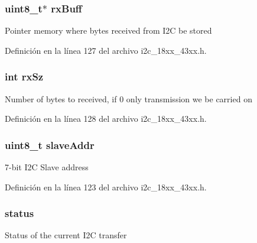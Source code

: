 \subsubsection[{\texorpdfstring{rx\+Buff}{rxBuff}}]{\setlength{\rightskip}{0pt plus 5cm}uint8\+\_\+t$\ast$ rx\+Buff}\hypertarget{struct_i2_c___x_f_e_r___t_a0aa410ff8cbc01a00b2fa2189e1c2938}{}\label{struct_i2_c___x_f_e_r___t_a0aa410ff8cbc01a00b2fa2189e1c2938}
Pointer memory where bytes received from I2C be stored 

Definición en la línea 127 del archivo i2c\+\_\+18xx\+\_\+43xx.\+h.

\subsubsection[{\texorpdfstring{rx\+Sz}{rxSz}}]{\setlength{\rightskip}{0pt plus 5cm}int rx\+Sz}\hypertarget{struct_i2_c___x_f_e_r___t_a745e2b08d1a5413929a13d9aa30137c5}{}\label{struct_i2_c___x_f_e_r___t_a745e2b08d1a5413929a13d9aa30137c5}
Number of bytes to received, if 0 only transmission we be carried on 

Definición en la línea 128 del archivo i2c\+\_\+18xx\+\_\+43xx.\+h.

\subsubsection[{\texorpdfstring{slave\+Addr}{slaveAddr}}]{\setlength{\rightskip}{0pt plus 5cm}uint8\+\_\+t slave\+Addr}\hypertarget{struct_i2_c___x_f_e_r___t_a771bfcb0b066269afae6905ce5804c89}{}\label{struct_i2_c___x_f_e_r___t_a771bfcb0b066269afae6905ce5804c89}
7-\/bit I2C Slave address 

Definición en la línea 123 del archivo i2c\+\_\+18xx\+\_\+43xx.\+h.

\subsubsection[{\texorpdfstring{status}{status}}]{ status}\hypertarget{struct_i2_c___x_f_e_r___t_a30a194e0acd94c980e171b51999d2aa8}{}\label{struct_i2_c___x_f_e_r___t_a30a194e0acd94c980e171b51999d2aa8}
Status of the current I2C transfer 

